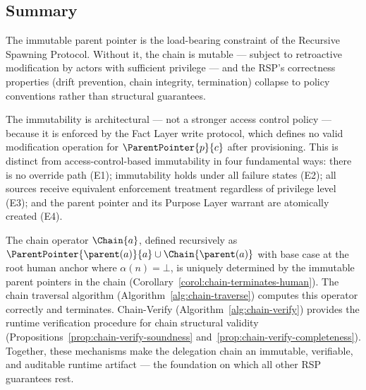 \subsection{Summary}
\label{sec:immutable-parent-pointers-summary}

The immutable parent pointer is the load-bearing constraint of the Recursive Spawning Protocol. Without it, the chain is mutable --- subject to retroactive modification by actors with sufficient privilege --- and the RSP's correctness properties (drift prevention, chain integrity, termination) collapse to policy conventions rather than structural guarantees.

The immutability is architectural --- not a stronger access control policy --- because it is enforced by the Fact Layer write protocol, which defines no valid modification operation for $\ParentPointer{p}{c}$ after provisioning. This is distinct from access-control-based immutability in four fundamental ways: there is no override path (E1); immutability holds under all failure states (E2); all sources receive equivalent enforcement treatment regardless of privilege level (E3); and the parent pointer and its Purpose Layer warrant are atomically created (E4).

The chain operator $\Chain{a}$, defined recursively as $\ParentPointer{\parent(a)}{a} \cup \Chain{\parent(a)}$ with base case at the root human anchor where $\alpha(n) = \bot$, is uniquely determined by the immutable parent pointers in the chain (Corollary~\ref{corol:chain-terminates-human}). The chain traversal algorithm (Algorithm~\ref{alg:chain-traverse}) computes this operator correctly and terminates. Chain-Verify (Algorithm~\ref{alg:chain-verify}) provides the runtime verification procedure for chain structural validity (Propositions~\ref{prop:chain-verify-soundness} and~\ref{prop:chain-verify-completeness}). Together, these mechanisms make the delegation chain an immutable, verifiable, and auditable runtime artifact --- the foundation on which all other RSP guarantees rest.
